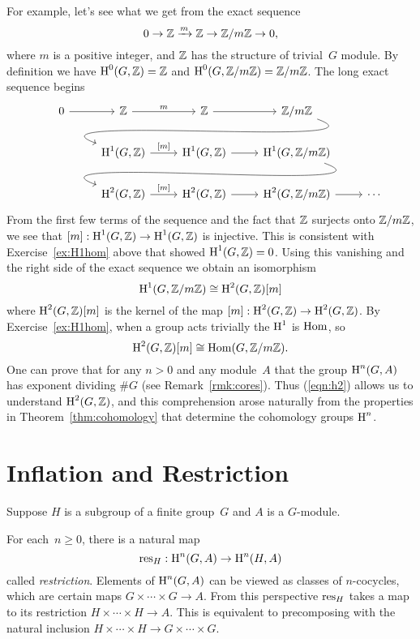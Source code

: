 For example, let's see what we get from the exact sequence
$$
	0 \to \mathbb{Z} \xrightarrow{m} \mathbb{Z} \to \mathbb{Z}/m\mathbb{Z} \to 0,
$$
where $m$ is a positive integer, and $\mathbb{Z}$ has the structure of
trivial~$G$ module.  By definition we have
$\operatorname{H}^0(G,\mathbb{Z}) = \mathbb{Z}$ and $\operatorname{H}^0(G,\mathbb{Z}/m\mathbb{Z})=\mathbb{Z}/m\mathbb{Z}$.
The long exact sequence begins
$$
\begin{tikzcd}
	0 \rar & \Z \rar{m} & \Z \rar & \Z/m\Z \ar[out=-20, in=160]{dll}
	\\
	& \H^1(G,\Z) \rar{[m]} & \H^1(G,\Z) \rar & \H^1(G,\Z/m\Z) \ar[out=-20, in=160]{dll}
	\\
	& \H^2(G,\Z) \rar{[m]} & \H^2(G,\Z) \rar & \H^2(G,\Z/m\Z) \rar & \cdots
\end{tikzcd}
$$
From the first few terms of the sequence and the fact
that $\mathbb{Z}$ surjects onto $\mathbb{Z}/m\mathbb{Z}$, we see that
$[m]:\operatorname{H}^1(G,\mathbb{Z}) \to \operatorname{H}^1(G,\mathbb{Z})$ is injective.
This is consistent with Exercise~\ref{ex:H1hom} above that
showed $\operatorname{H}^1(G,\mathbb{Z}) = 0$. Using this vanishing and the right side
of the exact sequence we obtain an isomorphism
$$
\operatorname{H}^1(G,\mathbb{Z}/m\mathbb{Z}) \cong \operatorname{H}^2(G,\mathbb{Z})[m]
$$
where $\operatorname{H}^2(G,\mathbb{Z})[m]$ is the kernel of the map
$[m]:\operatorname{H}^2(G,\mathbb{Z}) \to \operatorname{H}^2(G,\mathbb{Z})$.
By Exercise~\ref{ex:H1hom}, when a group acts trivially the $\operatorname{H}^1$
is $\operatorname{Hom}$, so
\begin{equation}\label{eqn:h2}
	\operatorname{H}^2(G,\mathbb{Z})[m] \cong \operatorname{Hom}(G,\mathbb{Z}/m\mathbb{Z}).
\end{equation}
One can prove that for any $n>0$ and any module~$A$ that the group
$\operatorname{H}^n(G,A)$ has exponent dividing $\#G$ (see Remark~\ref{rmk:cores}).
Thus (\ref{eqn:h2}) allows
us to understand $\operatorname{H}^2(G,\mathbb{Z})$, and this comprehension arose
naturally from the properties in Theorem~\ref{thm:cohomology}
that determine the cohomology groups $\operatorname{H}^n$.



\section{Inflation and Restriction}

Suppose $H$ is a subgroup of a finite group~$G$ and $A$
is a $G$-module.

For each~$n\geq 0$, there is a natural map
$$
	\operatorname{res}_H : \operatorname{H}^n(G,A) \to \operatorname{H}^n(H,A)
$$
called \emph{restriction}. Elements of $\operatorname{H}^n(G,A)$ can be
viewed as classes of $n$-cocycles, which are certain maps
$G \times \cdots \times G \to A$. From this perspective $\operatorname{res}_H$
takes a map to its restriction $H \times \cdots \times H \to A$.
This is equivalent to precomposing with the natural inclusion
$H\times\cdots\times H \to G\times\cdots\times G$.

